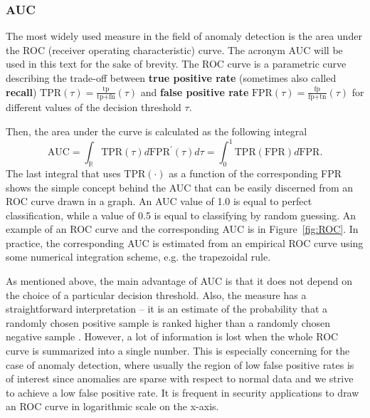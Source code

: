 \subsubsection{AUC}
The most widely used measure in the field of anomaly detection is the area under the ROC (receiver operating characteristic) curve. The acronym AUC will be used in this text for the sake of brevity. The ROC curve is a parametric curve describing the trade-off between \textbf{true positive rate} (sometimes also called \textbf{recall}) $\text{TPR}(\tau) = \frac{\text{tp}}{\text{tp+fn}}(\tau)$ and \textbf{false positive rate} $\text{FPR}(\tau) = \frac{\text{fp}}{\text{fp+tn}}(\tau)$ for different values of the decision threshold $\tau$. 

Then, the area under the curve is calculated as the following integral
\begin{equation} \label{eq:auc}
\text{AUC}=\int_{\mathbb{R}}\text{TPR}(\tau)d\text{FPR}^{\prime}(\tau)d\tau = \int_0^1\text{TPR}(\text{FPR})d\text{FPR}.
\end{equation}
The last integral that uses $\text{TPR}(\cdot)$ as a function of the corresponding FPR shows the simple concept behind the AUC that can be easily discerned from an ROC curve drawn in a graph. An AUC value of 1.0 is equal to perfect classification, while a value of 0.5 is equal to classifying by random guessing. An example of an ROC curve and the corresponding AUC is in Figure~\ref{fig:ROC}. In practice, the corresponding AUC is estimated from an empirical ROC curve using some numerical integration scheme, e.g. the trapezoidal rule.

As mentioned above, the main advantage of AUC is that it does not depend on the choice of a particular decision threshold. Also, the measure has a straightforward interpretation -- it is an estimate of the probability that a randomly chosen positive sample is ranked higher than a randomly chosen negative sample \cite{hand2001simple}. However, a lot of information is lost when the whole ROC curve is summarized into a single number. This is especially concerning for the case of anomaly detection, where usually the region of low false positive rates is of interest since anomalies are sparse with respect to normal data and we strive to achieve a low false positive rate. It is frequent in security applications to draw an ROC curve in logarithmic scale on the x-axis.

